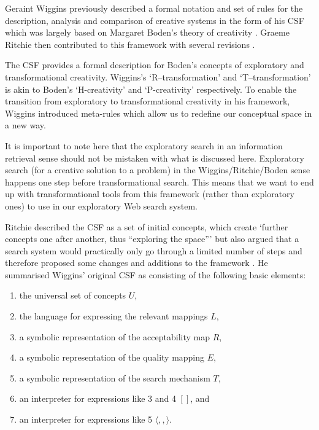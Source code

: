 Geraint Wiggins previously described a formal notation and set of rules for the description, analysis and comparison of creative systems in the form of his \ac{CSF} \citeyear{Wiggins2006} which was largely based on Margaret Boden's theory of creativity \autocite{Boden2003}. Graeme Ritchie then contributed to this framework with several revisions \citeyear{Ritchie2012}.


The \ac{CSF} provides a formal description for Boden's concepts of exploratory and transformational creativity. Wiggins's `R–transformation' and `T–transformation' is akin to Boden's `H-creativity' and `P-creativity' respectively. To enable the transition from exploratory to transformational creativity in his framework, Wiggins introduced meta-rules which allow us to redefine our conceptual space in a new way.

It is important to note here that the exploratory search in an information retrieval sense should not be mistaken with what is discussed here. Exploratory search (for a creative solution to a problem) in the Wiggins/Ritchie/Boden sense happens one step before transformational search. This means that we want to end up with transformational tools from this framework (rather than exploratory ones) to use in our exploratory Web search system.

Ritchie described the \ac{CSF} as a set of initial concepts, which create `further concepts one after another, thus ``exploring the space''' but also argued that a search system would practically only go through a limited number of steps and therefore proposed some changes and additions to the framework \citeyear{Ritchie2012}. He summarised Wiggins' original \ac{CSF} as consisting of the following basic elements:

\begin{enumerate}
	\item the universal set of concepts $U$,
	\item the language for expressing the relevant mappings $L$,
	\item a symbolic representation of the acceptability map $R$,
	\item a symbolic representation of the quality mapping $E$,
  \item a symbolic representation of the search mechanism $T$,
	\item an interpreter for expressions like 3 and 4 $[ ]$, and
	\item an interpreter for expressions like 5 $\langle , , \rangle$.
\end{enumerate}

